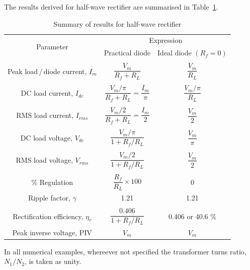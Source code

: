 The results derived for half-wave rectifier are summarised in Table~\ref{tab2.1}.
\begin{table}[H]
\caption{Summary of results for half-wave rectifier}\label{tab2.1}
\renewcommand{\arraystretch}{1.3}
\tabcolsep=9pt
\begin{tabular}{|c|c|c|}
\hline
\multirow{2}{1.5cm}{Parameter}\index{Half-wave rectifier!parameter} & \multicolumn{2}{c|}{Expression}\\\cline{2-3}
& Practical diode & Ideal diode $(R_f=0)$\\
\hline
&&\\[-14pt]
Peak load\,/\,diode current, $I_m$ & $\dfrac{V_m}{R_f + R_L}$ &
$\dfrac{V_m}{R_L}$\\[7pt]
\hline
&&\\[-14pt]
DC load current, $I_{dc}$ & $\dfrac{V_m/\pi}{R_f + R_L} =
\dfrac{I_m}{\pi}$ & $\dfrac{V_m/\pi}{R_L}$\\[7pt]
\hline
&&\\[-14pt]
RMS load current, $I_{rms}$ & $\dfrac{V_m/2}{R_f+R_L} =
\dfrac{I_m}{2}$  & $\dfrac{V_m}{2}$\\[7pt]
\hline
&&\\[-14pt]
DC load voltage, $V_{dc}$ & $\dfrac{V_m/\pi}{1+ R_{f}/R_L}$ &
$\dfrac{V_m}{\pi}$\\[7pt]
\hline
&&\\[-14pt]
RMS load voltage, $V_{rms}$ & $\dfrac{V_m /2}{1 + R_f / R_L}$ &
$\dfrac{V_m}{2}$\\[7pt]
\hline
&&\\[-14pt]
$\%$ Regulation & $\dfrac{R_f}{R_L} \times 100$ & 0\\[7pt]
\hline
Ripple factor, $\gamma$ & 1.21 & 1.21\\
\hline
&&\\[-14pt]
Rectification efficiency, $\eta_r$ & $\dfrac{0.406}{1+R_f /R_L}$ &
0.406  or 40.6 \% \\[7pt]
\hline
Peak inverse voltage, PIV & $V_m$ & $V_m$\\
\hline
\end{tabular}
\end{table}

In all numerical examples, whereever not specified the transformer
turns ratio, $N_1/N_2$, is taken as unity. 

\eject

